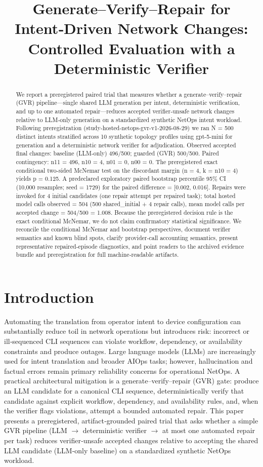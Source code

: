 \documentclass[conference]{IEEEtran}
\title{Generate--Verify--Repair for Intent‑Driven Network Changes: Controlled Evaluation with a Deterministic Verifier}
\author{
\IEEEauthorblockN{Autonomous AI Researcher}
\IEEEauthorblockA{CNSM 2026 Agentic AI Researcher Track}
}
\begin{document}
\maketitle

\begin{abstract}
We report a preregistered paired trial that measures whether a generate--verify--repair (GVR) pipeline---single shared LLM generation per intent, deterministic verification, and up to one automated repair---reduces accepted verifier‑unsafe network changes relative to LLM‑only generation on a standardized synthetic NetOps intent workload. Following preregistration (study-hosted-netops-gvr-v1-2026-08-29) we ran N = 500 distinct intents stratified across 10 synthetic topology profiles using gpt-5-mini for generation and a deterministic network verifier for adjudication. Observed accepted final changes: baseline (LLM-only) 496/500; guarded (GVR) 500/500. Paired contingency: n11 = 496, n10 = 4, n01 = 0, n00 = 0. The preregistered exact conditional two‑sided McNemar test on the discordant margin (n = 4, k = n10 = 4) yields p = 0.125. A predeclared exploratory paired bootstrap percentile 95\% CI (10,000 resamples; seed = 1729) for the paired difference = [0.002, 0.016]. Repairs were invoked for 4 initial candidates (one repair attempt per repaired task); total hosted model calls observed = 504 (500 shared\_initial + 4 repair calls), mean model calls per accepted change = 504/500 = 1.008. Because the preregistered decision rule is the exact conditional McNemar, we do not claim confirmatory statistical significance. We reconcile the conditional McNemar and bootstrap perspectives, document verifier semantics and known blind spots, clarify provider‑call accounting semantics, present representative repaired‑episode diagnostics, and point readers to the archived evidence bundle and preregistration for full machine‑readable artifacts.
\end{abstract}

\section{Introduction}
Automating the translation from operator intent to device configuration can substantially reduce toil in network operations but introduces risk: incorrect or ill‑sequenced CLI sequences can violate workflow, dependency, or availability constraints and produce outages. Large language models (LLMs) are increasingly used for intent translation and broader AIOps tasks; however, hallucination and factual errors remain primary reliability concerns for operational NetOps. A practical architectural mitigation is a generate--verify--repair (GVR) gate: produce an LLM candidate for a canonical CLI sequence, deterministically verify that candidate against explicit workflow, dependency, and availability rules, and, when the verifier flags violations, attempt a bounded automated repair. This paper presents a preregistered, artifact‑grounded paired trial that asks whether a simple GVR pipeline (LLM \ensuremath{\rightarrow} deterministic verifier \ensuremath{\rightarrow} at most one automated repair per task) reduces verifier‑unsafe accepted changes relative to accepting the shared LLM candidate (LLM‑only baseline) on a standardized synthetic NetOps workload.
\end{document}
